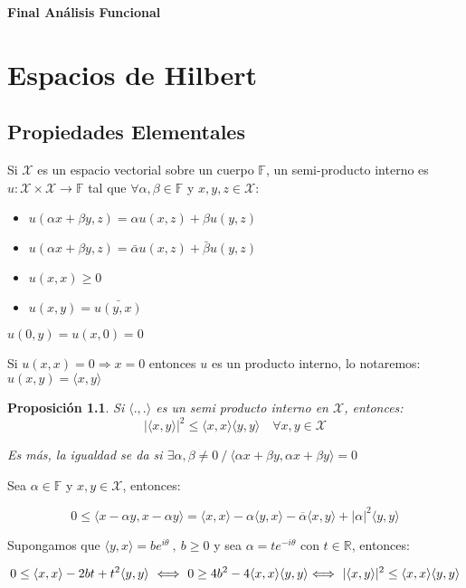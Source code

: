 \documentclass[11pt]{article}
\newcommand{\X}{\mathcal{X}}
\newcommand{\f}{\mathbb{F}}
\newcommand{\R}{{\mathbb{R}}}
\newcommand{\prodint}[1]{\langle #1 \rangle}
\newtheorem{proposition}[theorem]{Proposici\'on}
\newenvironment{proof}[1][Demostraci\'on]{\begin{trivlist}
\item[\hskip \labelsep {\bfseries #1}]}{\end{trivlist}}
\newenvironment{definition}[1][Definici\'on]{\begin{trivlist}
\item[\hskip \labelsep {\bfseries #1}]}{\end{trivlist}}
\newenvironment{remark}[1][Observaci\'on]{\begin{trivlist}
\item[\hskip \labelsep {\bfseries #1}]}{\end{trivlist}}
\newcommand{\qed}{\nobreak \ifvmode \relax \else
      \ifdim\lastskip<1.5em \hskip-\lastskip
      \hskip1.5em plus0em minus0.5em \fi \nobreak
      \vrule height0.75em width0.5em depth0.25em\fi}
\begin{document}
\pagestyle{empty}
\pagestyle{fancy}
\fancyfoot[CO]{\slshape \thepage}
\renewcommand{\headrulewidth}{0pt}



\centerline{\bf Final An\'alisis Funcional}

\bigskip

\chapter{Espacios de Hilbert}

\section{Propiedades Elementales}

\begin{definition}
Si $\X$ es un espacio vectorial sobre un cuerpo $\f$, un semi-producto interno es $u: \X \times \X \rightarrow \f$ tal que $\forall \alpha, \beta \in \f$ y $x,y,z \in \X$:

\begin{itemize}
\item $u(\alpha x + \beta y, z) = \alpha u(x,z) + \beta u(y,z)$
\item $u(\alpha x + \beta y, z) = \bar{\alpha} u(x,z) + \bar{\beta} u(y,z)$
\item $u(x,x) \geq 0$
\item $u(x,y) = \bar{u(y,x)}$
\end{itemize}

\end{definition}

\begin{remark}
$u(0,y)=u(x,0)=0$
\end{remark}

Si $u(x,x)=0 \Longrightarrow x=0$ entonces $u$ es un producto interno, lo notaremos: $u(x,y)=\prodint{x,y}$

\begin{proposition}

Si $\prodint{.,.}$ es un semi producto interno en $\X$, entonces:
\[
|\prodint{x,y}|^2 \leq \prodint{x,x} \prodint{y,y} \quad \forall x,y \in \X
\]

Es m\'as, la igualdad se da si $\exists \alpha,\beta \neq 0 \ / \ \prodint{\alpha x + \beta y , \alpha x + \beta y} = 0$

\end{proposition}

\begin{proof}

Sea $\alpha \in \f$ y $x,y \in \X$, entonces:

\[
0 \leq \prodint{x - \alpha y , x - \alpha y} = \prodint{x,x} - \alpha \prodint{y,x} - \overline{\alpha}{\prodint{x,y}} + |\alpha|^2\prodint{y,y}
\]

Supongamos que $\prodint{y,x} = be^{i \theta} \ , \ b\geq 0$ y sea $\alpha = te^{-i \theta}$ con $t \in \R$, entonces:

\[
0 \leq \prodint{x,x} - 2bt + t^2 \prodint{y,y} \ \Longleftrightarrow \ 0 \geq 4b^2 - 4 \prodint{x,x} \prodint{y,y}
\\
\Longleftrightarrow \ |\prodint{x,y}|^2 \leq \prodint{x,x} \prodint{y,y}
\]
\qed
\end{proof}
\end{document}
